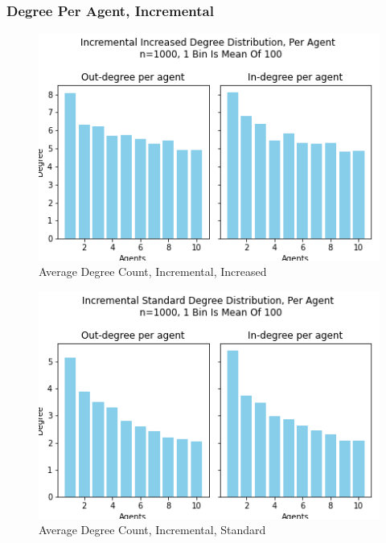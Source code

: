 \documentclass{article}
\begin{document}
\subsubsection{Degree Per Agent, Incremental}
\begin{center}
    \begin{figure}[!htbp]
        \centering
        \includegraphics[width=.8\textwidth]{ThesisKI/Images/IncreasedPerAgentIncremental.png}
        \caption{Average Degree Count, Incremental, Increased}
        \label{DPA:IncInc}
    \end{figure}
\end{center}
\begin{center}
    \begin{figure}[!htbp]
        \centering
        \includegraphics[width=.8\textwidth]{ThesisKI/Images/StandardPerAgentIncremental.png}
        \caption{Average Degree Count, Incremental, Standard}
        \label{DPA:IncStd}
    \end{figure}
\end{center}
\newpage
\end{document}
